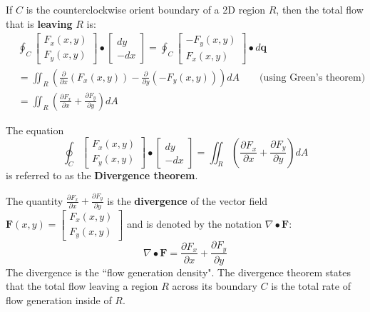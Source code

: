 \documentclass{article}
\begin{document}
If \(C\) is the counterclockwise orient boundary of a 2D region \(R\), then the total flow that is {\bf leaving} \(R\) is:
\begin{align*}
& \oint_C \begin{bmatrix} F_x(x,y) \\ F_y(x,y) \end{bmatrix} \bullet \begin{bmatrix} dy \\ -dx \end{bmatrix} 
= \oint_C \begin{bmatrix} -F_y(x,y) \\ F_x(x,y) \end{bmatrix} \bullet d\mathbf{q} \\ 
& = \iint_R \left(\frac{\partial}{\partial x}(F_x(x,y)) - \frac{\partial}{\partial y}(-F_y(x,y))\right)dA \quad\quad\text{(using Green's theorem)} \\
& = \iint_R \left(\frac{\partial F_x}{\partial x} + \frac{\partial F_y}{\partial y}\right)dA
\end{align*}

The equation
\[\oint_C \begin{bmatrix} F_x(x,y) \\ F_y(x,y) \end{bmatrix} \bullet \begin{bmatrix} dy \\ -dx \end{bmatrix} = \iint_R \left(\frac{\partial F_x}{\partial x} + \frac{\partial F_y}{\partial y}\right)dA\]
is referred to as the {\bf Divergence theorem}. 

The quantity \(\frac{\partial F_x}{\partial x} + \frac{\partial F_y}{\partial y}\) is the {\bf divergence} of the vector field \(\mathbf{F}(x,y) = \begin{bmatrix} F_x(x,y) \\ F_y(x,y) \end{bmatrix}\) and is denoted by the notation \(\nabla \bullet \mathbf{F}\):
\[\nabla \bullet \mathbf{F} = \frac{\partial F_x}{\partial x} + \frac{\partial F_y}{\partial y}\]
The divergence is the ``flow generation density". The divergence theorem states that the total flow leaving a region \(R\) across its boundary \(C\) is the total rate of flow generation inside of \(R\).
\end{document}
